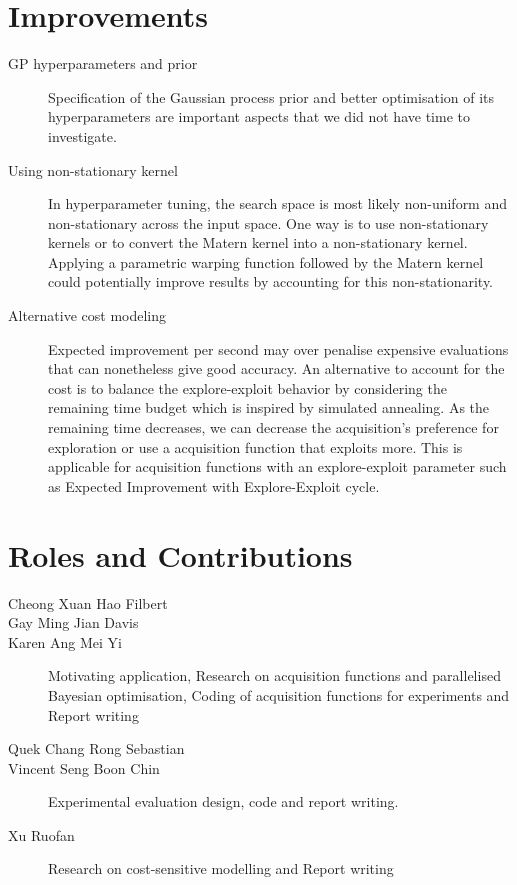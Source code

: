 \documentclass[letterpaper]{article}
\begin{document}
\section{Improvements}
\begin{description}
\item [GP hyperparameters and prior] Specification of the Gaussian process prior and better optimisation of its 
hyperparameters are important aspects that we did not have time to investigate.
\item [Using non-stationary kernel] In hyperparameter tuning, the search space is most likely non-uniform and 
non-stationary across the input space. One way is to use non-stationary
kernels or to convert the Matern kernel into a non-stationary kernel.
\cite{shahriari2016taking} Applying a parametric warping
function followed by the Matern kernel could potentially improve results by
accounting for this non-stationarity.
\item [Alternative cost modeling] Expected improvement per second may over penalise expensive evaluations that can nonetheless give good accuracy.
An alternative to account for the cost is to balance the explore-exploit behavior by considering the remaining time budget which is inspired by simulated annealing.
As the remaining time decreases, we can decrease the acquisition's preference for exploration or use a acquisition function that exploits more.
This is applicable for acquisition functions with an explore-exploit parameter such as Expected Improvement with Explore-Exploit cycle.
\end{description}

\section{Roles and Contributions}
\begin{description}
\item [Cheong Xuan Hao Filbert]
\item [Gay Ming Jian Davis]
\item [Karen Ang Mei Yi] Motivating application, Research on acquisition functions
and parallelised Bayesian optimisation, Coding of acquisition functions for experiments and Report writing
\item [Quek Chang Rong Sebastian]
\item [Vincent Seng Boon Chin] Experimental evaluation design, code and report writing.
\item [Xu Ruofan] Research on cost-sensitive modelling and Report writing
\end{description}



\end{document}
